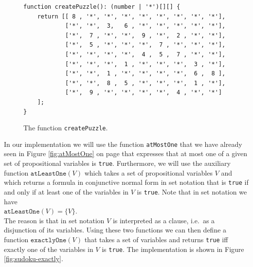 \begin{figure}[!ht]
\centering
\begin{verbatim}
function createPuzzle(): (number | '*')[][] {
    return [[ 8 , '*', '*', '*', '*', '*', '*', '*', '*'],
            ['*', '*',  3,   6 , '*', '*', '*', '*', '*'],
            ['*',  7 , '*', '*',  9 , '*',  2 , '*', '*'],
            ['*',  5 , '*', '*', '*',  7 , '*', '*', '*'],
            ['*', '*', '*', '*',  4 ,  5 ,  7 , '*', '*'],
            ['*', '*', '*',  1 , '*', '*', '*',  3 , '*'],
            ['*', '*',  1 , '*', '*', '*', '*',  6 ,  8 ],
            ['*', '*',  8 ,  5 , '*', '*', '*',  1 , '*'],
            ['*',  9 , '*', '*', '*', '*',  4 , '*', '*']
    ];
}
\end{verbatim}
\vspace*{-0.3cm}
\caption{The function \texttt{createPuzzle}.}
\label{fig:sudoku-create-puzzle}
\end{figure}

In our implementation we will use the function \texttt{atMostOne} that we have already seen in Figure
\ref{fig:atMostOne} on page \pageref{fig:atMostOne} that expresses that at most one of a given set of
propositional variables is \texttt{true}.  Furthermore, we will use the auxiliary function
$\texttt{atLeastOne}(V)$ which takes a set of propositional variables $V$ and which returns a formula in
conjunctive normal form in set notation that is \texttt{true} if and only if at least one of the variables in
$V$ is \texttt{true}.  Note that in set notation we have
\\[0.2cm]
\hspace*{1.3cm}
$\texttt{atLeastOne}(V) = \bigl\{ V \bigr\}$.
\\[0.2cm]
The reason is that in set notation  $V$ is interpreted as a clause, i.e.~as a disjunction of its variables.
Using these two functions we can then define a function $\texttt{exactlyOne}(V)$ that
takes a set of variables and returns \texttt{true} iff exactly one of the variables in $V$ is \texttt{true}.
The implementation is shown in Figure \ref{fig:sudoku-exactly}.


